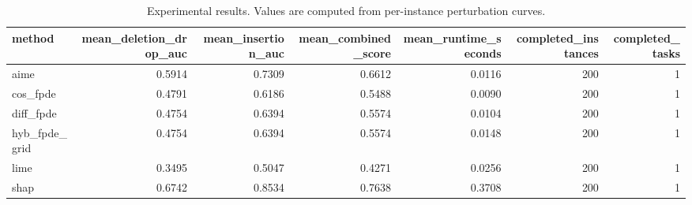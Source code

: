 \begin{table}[t]
\caption{Experimental results. Values are computed from per-instance perturbation curves.}
\label{tab:main_results_computed}
\centering
\begin{tabular}{lrrrrrr}
\toprule
method & mean\_deletion\_drop\_auc & mean\_insertion\_auc & mean\_combined\_score & mean\_runtime\_seconds & completed\_instances & completed\_tasks \\
\midrule
aime & 0.5914 & 0.7309 & 0.6612 & 0.0116 & 200 & 1 \\
cos\_fpde & 0.4791 & 0.6186 & 0.5488 & 0.0090 & 200 & 1 \\
diff\_fpde & 0.4754 & 0.6394 & 0.5574 & 0.0104 & 200 & 1 \\
hyb\_fpde\_grid & 0.4754 & 0.6394 & 0.5574 & 0.0148 & 200 & 1 \\
lime & 0.3495 & 0.5047 & 0.4271 & 0.0256 & 200 & 1 \\
shap & 0.6742 & 0.8534 & 0.7638 & 0.3708 & 200 & 1 \\
\bottomrule
\end{tabular}

\end{table}
